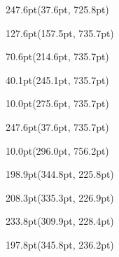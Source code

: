 \documentclass{article}
\begin{document}
\begin{textblock*}{247.6pt}(37.6pt, 725.8pt)%
\noindent%
%
\end{textblock*}
\begin{textblock*}{127.6pt}(157.5pt, 735.7pt)%
\noindent%
%
\end{textblock*}
\begin{textblock*}{70.6pt}(214.6pt, 735.7pt)%
\noindent%
%
\end{textblock*}
\begin{textblock*}{40.1pt}(245.1pt, 735.7pt)%
\noindent%
%
\end{textblock*}
\begin{textblock*}{10.0pt}(275.6pt, 735.7pt)%
\noindent%
%
\end{textblock*}
\begin{textblock*}{247.6pt}(37.6pt, 735.7pt)%
\noindent%
%
\end{textblock*}
\begin{textblock*}{10.0pt}(296.0pt, 756.2pt)%
\noindent%
%
\end{textblock*}
\begin{textblock*}{198.9pt}(344.8pt, 225.8pt)%
\noindent%
%
\end{textblock*}
\begin{textblock*}{208.3pt}(335.3pt, 226.9pt)%
\noindent%
%
\end{textblock*}
\begin{textblock*}{233.8pt}(309.9pt, 228.4pt)%
\noindent%
%
\end{textblock*}
\begin{textblock*}{197.8pt}(345.8pt, 236.2pt)%
\noindent%
%
\end{textblock*}
\end{document}
